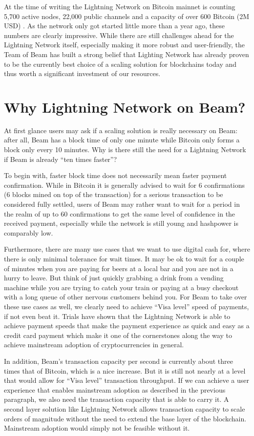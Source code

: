 \documentclass[letterpaper]{article}
\begin{document}
At the time of writing the Lightning Network on Bitcoin mainnet is counting 5,700 active nodes, 22,000 public channels and a capacity of over 600 Bitcoin (2M USD) \cite{stats}. As the network only got started little more than a year ago, these numbers are clearly impressive. While there are still challenges ahead for the Lightning Network itself, especially making it more robust and user-friendly, the Team of Beam has built a strong belief that Lighting Network has already proven to be the currently best choice of a scaling solution for blockchains today and thus worth a significant investment of our resources.

\section{Why Lightning Network on Beam?}
At first glance users may ask if a scaling solution is really necessary on Beam: after all, Beam has a block time of only one minute while Bitcoin only forms a block only every 10 minutes. Why is there still the need for a Lightning Network if Beam is already “ten times faster”?

To begin with, faster block time does not necessarily mean faster payment confirmation. While in Bitcoin it is generally advised to wait for 6 confirmations (6 blocks mined on top of the transaction) for a serious transaction to be considered fully settled, users of Beam may rather want to wait for a period in the realm of up to 60 confirmations to get the same level of confidence in the received payment, especially while the network is still young and hashpower is comparably low.

Furthermore, there are many use cases that we want to use digital cash for, where there is only minimal tolerance for wait times. It may be ok to wait for a couple of minutes when you are paying for beers at a local bar and you are not in a hurry to leave. But think of just quickly grabbing a drink from a vending machine while you are trying to catch your train or paying at a busy checkout with a long queue of other nervous customers behind you. For Beam to take over these use cases as well, we clearly need to achieve “Visa level” speed of payments, if not even beat it. Trials have shown that the Lightning Network is able to achieve payment speeds that make the payment experience as quick and easy as a credit card payment which make it one of the cornerstones along the way to achieve mainstream adoption of cryptocurrencies in general.

In addition, Beam’s transaction capacity per second is currently about three times that of Bitcoin, which is a nice increase. But it is still not nearly at a level that would allow for “Visa level” transaction throughput. If we can achieve a user experience that enables mainstream adoption as described in the previous paragraph, we also need the transaction capacity that is able to carry it. A second layer solution like Lightning Network allows transaction capacity to scale orders of magnitude without the need to extend the base layer of the blockchain. Mainstream adoption would simply not be feasible without it.
\end{document}
